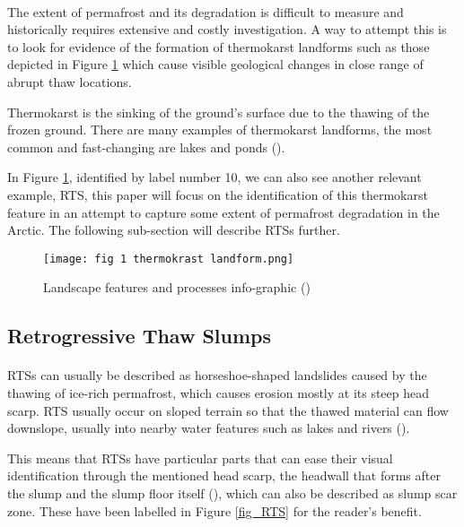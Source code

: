 \paragraph{}
The extent of permafrost and its degradation is difficult to measure and historically requires extensive and costly investigation. A way to attempt this is to look for evidence of the formation of thermokarst landforms such as those depicted in Figure \ref{fig_thermokrast} which cause visible geological changes in close range of abrupt thaw locations.

Thermokarst is the sinking of the ground's surface due to the thawing of the frozen ground. There are many examples of thermokarst landforms, the most common and fast-changing are lakes and ponds (\cite{thawpic}).

In Figure \ref{fig_thermokrast}, identified by label number 10, we can also see another relevant example, \gls{RTS}, this paper will focus on the identification of this thermokarst feature in an attempt to capture some extent of permafrost degradation in the Arctic. The following sub-section will describe \gls{RTS}s further.

    \begin{figure}[hbt!]
        \centering
        \texttt{[image: fig 1 thermokrast landform.png]}
        \caption{Landscape features and processes info-graphic (\cite{rs13061217})}
        \label{fig_thermokrast}
    \end{figure}



\subsection{Retrogressive Thaw Slumps}  \label{rts_intro}

\paragraph{}
\gls{RTS}s can usually be described as horseshoe-shaped landslides caused by the thawing of ice-rich permafrost, which causes erosion mostly at its steep head scarp. \gls{RTS} usually occur on sloped terrain so that the thawed material can flow downslope, usually into nearby water features such as lakes and rivers (\cite{articleperma}).
 
This means that \gls{RTS}s have particular parts that can ease their visual identification through the mentioned head scarp, the headwall that forms after the slump and the slump floor itself (\cite{LANTUIT200884}), which can also be described as slump scar zone. These have been labelled in Figure \ref{fig_RTS} for the reader's benefit. 

